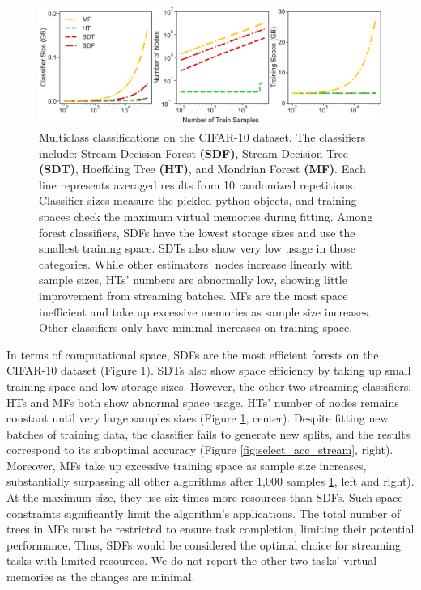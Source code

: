 \begin{figure}[!htb]
\centering
\includegraphics[width=0.9\columnwidth]{select_cifar_mem_stream}
  \caption{Multiclass classifications on the CIFAR-10 dataset. The classifiers include: Stream Decision Forest \textbf{(SDF)}, Stream Decision Tree \textbf{(SDT)}, Hoeffding Tree \textbf{(HT)}, and Mondrian Forest \textbf{(MF)}. 
  Each line represents averaged results from 10 randomized repetitions. Classifier sizes measure the pickled python objects, and training spaces check the maximum virtual memories during fitting.
  Among forest classifiers, SDFs have the lowest storage sizes and use the smallest training space. SDTs also show very low usage in those categories. 
  While other estimators' nodes increase linearly with sample sizes, HTs' numbers are abnormally low, showing little improvement from streaming batches.
  MFs are the most space inefficient and take up excessive memories as sample size increases. Other classifiers only have minimal increases on training space.
  }
\label{fig:select_cifar_mem_stream}
\end{figure}

In terms of computational space, SDFs are the most efficient forests on the CIFAR-10 dataset (Figure \ref{fig:select_cifar_mem_stream}). 
SDTs also show space efficiency by taking up small training space and low storage sizes.
However, the other two streaming classifiers: HTs and MFs both show abnormal space usage.
HTs' number of nodes remains constant until very large samples sizes (Figure \ref{fig:select_cifar_mem_stream}, center). Despite fitting new batches of training data, the classifier fails to generate new splits, and the results correspond to its suboptimal accuracy (Figure \ref{fig:select_acc_stream}, right).
Moreover, MFs take up excessive training space as sample size increases, substantially surpassing all other algorithms after 1,000 samples \ref{fig:select_cifar_mem_stream}, left and right). At the maximum size, they use six times more resources than SDFs.
Such space constraints significantly limit the algorithm's applications. The total number of trees in MFs must be restricted to ensure task completion, limiting their potential performance. 
Thus, SDFs would be considered the optimal choice for streaming tasks with limited resources. We do not report the other two tasks' virtual memories as the changes are minimal. 


